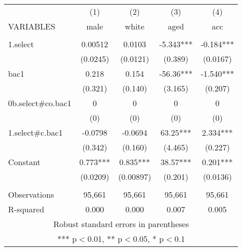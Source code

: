 \documentclass[]{article}
\begin{document}
\begin{tabular}{lcccc} \hline
 & (1) & (2) & (3) & (4) \\
VARIABLES & male & white & aged & acc \\ \hline
 &  &  &  &  \\
1.select & 0.00512 & 0.0103 & -5.343*** & -0.184*** \\
 & (0.0245) & (0.0121) & (0.389) & (0.0167) \\
bac1 & 0.218 & 0.154 & -56.36*** & -1.540*** \\
 & (0.321) & (0.140) & (3.165) & (0.207) \\
0b.select\#co.bac1 & 0 & 0 & 0 & 0 \\
 & (0) & (0) & (0) & (0) \\
1.select\#c.bac1 & -0.0798 & -0.0694 & 63.25*** & 2.334*** \\
 & (0.342) & (0.160) & (4.465) & (0.227) \\
Constant & 0.773*** & 0.835*** & 38.57*** & 0.201*** \\
 & (0.0209) & (0.00897) & (0.201) & (0.0136) \\
 &  &  &  &  \\
Observations & 95,661 & 95,661 & 95,661 & 95,661 \\
 R-squared & 0.000 & 0.000 & 0.007 & 0.005 \\ \hline
\multicolumn{5}{c}{ Robust standard errors in parentheses} \\
\multicolumn{5}{c}{ *** p$<$0.01, ** p$<$0.05, * p$<$0.1} \\
\end{tabular}
\end{document}

